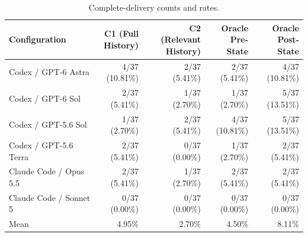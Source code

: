 \documentclass{article} %
\begin{document}
\begin{table}[htbp]
\centering\normalsize
\setlength{\tabcolsep}{3pt}
\renewcommand{\arraystretch}{1.08}
\caption{Complete-delivery counts and rates.}
\label{tab:complete-delivery-counts}
\begin{tabularx}{\linewidth}{@{}>{\raggedright\arraybackslash}Xrrrr@{}}
\toprule
Configuration & \shortstack[c]{C1 (Full\\History)} & \shortstack[c]{C2 (Relevant\\History)} & \shortstack[c]{Oracle\\Pre-State} & \shortstack[c]{Oracle\\Post-State} \\
\midrule
Codex / GPT-6 Astra & \shortstack[r]{4/37\\(10.81\%)} & \shortstack[r]{2/37\\(5.41\%)} & \shortstack[r]{2/37\\(5.41\%)} & \shortstack[r]{4/37\\(10.81\%)} \\
Codex / GPT-6 Sol & \shortstack[r]{2/37\\(5.41\%)} & \shortstack[r]{1/37\\(2.70\%)} & \shortstack[r]{1/37\\(2.70\%)} & \shortstack[r]{5/37\\(13.51\%)} \\
Codex / GPT-5.6 Sol & \shortstack[r]{1/37\\(2.70\%)} & \shortstack[r]{2/37\\(5.41\%)} & \shortstack[r]{4/37\\(10.81\%)} & \shortstack[r]{5/37\\(13.51\%)} \\
Codex / GPT-5.6 Terra & \shortstack[r]{2/37\\(5.41\%)} & \shortstack[r]{0/37\\(0.00\%)} & \shortstack[r]{1/37\\(2.70\%)} & \shortstack[r]{2/37\\(5.41\%)} \\
Claude Code / Opus 5.5 & \shortstack[r]{2/37\\(5.41\%)} & \shortstack[r]{1/37\\(2.70\%)} & \shortstack[r]{2/37\\(5.41\%)} & \shortstack[r]{2/37\\(5.41\%)} \\
Claude Code / Sonnet 5 & \shortstack[r]{0/37\\(0.00\%)} & \shortstack[r]{0/37\\(0.00\%)} & \shortstack[r]{0/37\\(0.00\%)} & \shortstack[r]{0/37\\(0.00\%)} \\
Mean & 4.95\% & 2.70\% & 4.50\% & 8.11\% \\
\bottomrule
\end{tabularx}
\end{table}
\end{document}
